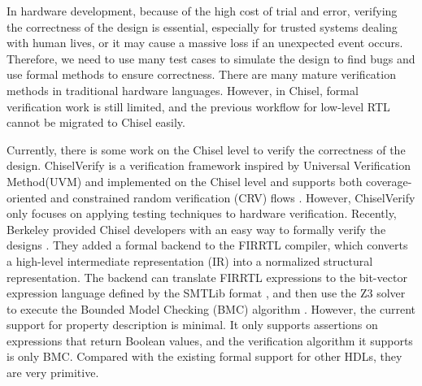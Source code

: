\documentclass[conference]{IEEEtran}
\theoremstyle{definition}
\begin{document}
In hardware development, because of the high cost of trial and error, verifying the correctness of the design is essential, especially for trusted systems dealing with human lives, or it may cause a massive loss if an unexpected event occurs. Therefore, we need to use many test cases to simulate the design to find bugs and use formal methods to ensure correctness. There are many mature verification methods in traditional hardware languages. However, in Chisel, formal verification work is still limited, and the previous workflow for low-level RTL cannot be migrated to Chisel easily.

Currently, there is some work on the Chisel level to verify the correctness of the design. ChiselVerify is a verification framework inspired by Universal Verification Method(UVM) and implemented on the Chisel level and supports both coverage-oriented and constrained random verification (CRV) flows \cite{dobis2021chiselverify}. However, ChiselVerify only focuses on applying testing techniques to hardware verification.
Recently, Berkeley provided Chisel developers with an easy way to formally verify the designs \cite{dobis2021open}. They added a formal backend to the FIRRTL compiler, which converts a high-level intermediate representation (IR) into a normalized structural representation. The backend can translate FIRRTL expressions to the bit-vector expression language defined by the SMTLib format \cite{barrett2010smt}, and then use the Z3 solver \cite{moura2008z3} to execute the Bounded Model Checking (BMC) algorithm \cite{biere2009bounded}.
However, the current support for property description is minimal. It only supports assertions on expressions that return Boolean values, and the verification algorithm it supports is only BMC. Compared with the existing formal support for other HDLs, they are very primitive.
\end{document}
